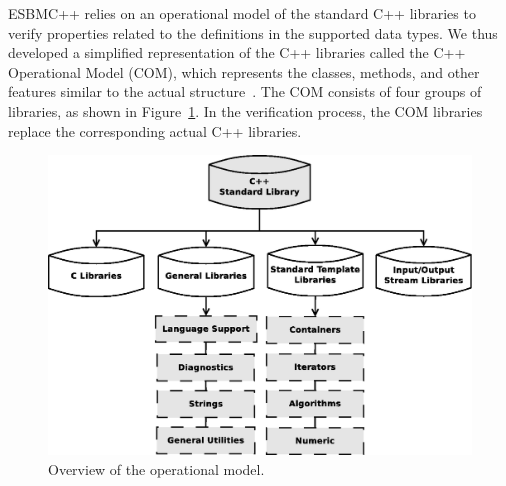 \documentclass[a4paper]{llncs}
\begin{document}

ESBMC++ relies on an operational model of the standard C++ libraries to
verify properties related to the definitions in the supported data
types.  We thus developed a simplified representation of the C++
libraries called the C++ Operational Model (COM), which represents the
classes, methods, and other features similar to the actual
structure~\cite{CppReference12}.
The COM consists of four groups of libraries,
as shown in Figure~\ref{figure:cpp-diagram}. 
In the verification process, the COM libraries
replace the corresponding actual C++ libraries.

\vspace*{-4ex}

\begin{figure}[ht] \centering
\includegraphics[scale=0.25]{figures/diagramascpp}
\caption{Overview of the operational model.} \vspace*{-4ex}
\label{figure:cpp-diagram}
\end{figure}

\end{document}
